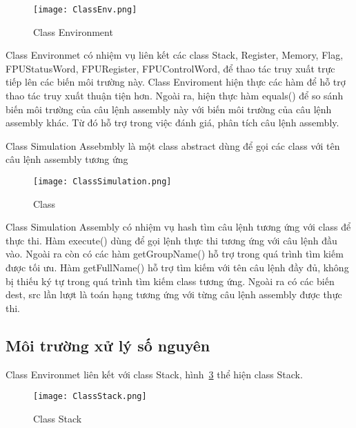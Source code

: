 		\begin{center}
			\begin{figure}[htp]
				\begin{center}
					\texttt{[image: ClassEnv.png]}
				\end{center}
				\caption{Class Environment}	
					\label{fig:ClassEnv}		
			\end{figure}
		\end{center}					
		
		Class Environmet có nhiệm vụ liên kết các class Stack, Register, Memory, Flag, FPUStatusWord, FPURegister, FPUControlWord, để thao tác truy xuất trực tiếp lên các biến môi trường này. Class Enviroment hiện thực các hàm để hỗ trợ thao tác truy xuất thuận tiện hơn. Ngoài ra, hiện thực hàm equals() để so sánh biến môi trường của câu lệnh assembly này với biến môi trường của câu lệnh assembly khác. Từ đó hỗ trợ trong việc đánh giá, phân tích câu lệnh assembly.
		
	\newpage
	Class Simulation Assebmbly là một class abstract dùng để gọi các class với tên câu lệnh assembly tương ứng	
	\begin{center}
			\begin{figure}[htp]
				\begin{center}
					\texttt{[image: ClassSimulation.png]}
				\end{center}
				\caption{Class}	
					\label{fig:}		
			\end{figure}
		\end{center}				
		
		Class Simulation Assembly có nhiệm vụ hash tìm câu lệnh tương ứng với class để thực thi. Hàm execute() dùng để gọi lệnh thực thi tương ứng với câu lệnh đầu vào. Ngoài ra còn có các hàm getGroupName() hỗ trợ trong quá trình tìm kiếm được tối ưu. Hàm getFullName() hỗ trợ tìm kiếm với tên câu lệnh đầy đủ, không bị thiếu ký tự trong quá trình tìm kiếm class tương ứng. Ngoài ra có các biến dest, src lần lượt là toán hạng tương ứng với từng câu lệnh assembly được thực thi. 
		
		\newpage
	\subsection*{Môi trường xử lý số nguyên}
	Class Environmet liên kết với class Stack, hình~\ref{fig:ClassStack} thể hiện class Stack.
		\begin{center}
			\begin{figure}[htp]
				\begin{center}
					\texttt{[image: ClassStack.png]}
				\end{center}
				\caption{Class Stack}	
					\label{fig:ClassStack}		
			\end{figure}
		\end{center}		
	

